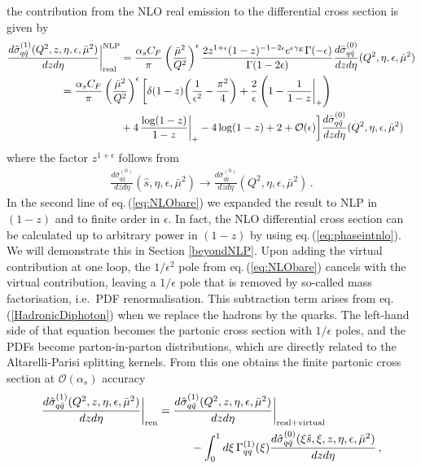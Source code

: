 \documentclass[11pt]{article}
\newcommand{\nn}{\nonumber}
\newcommand{\ord}{{\cal O}}
\newcommand{\eps}{\epsilon}
\newcommand\eqn[1]     {eq.\,(\ref{#1})}
\begin{document}
the contribution from the NLO real emission to 
the differential cross section is given by
\begin{align}\label{eq:NLObare}
    \frac{d\hat{\sigma}_{q\bar{q}}^{(1)}(Q^2,z,\eta,\epsilon,\bar\mu^2)}{dzd\eta}\bigg|_{\text{real}}^{\text{NLP}}&= \frac{\alpha_sC_F}{\pi}\left(\frac{\bar\mu^2}{Q^2}\right)^{\epsilon}\frac{2z^{1+\epsilon}(1-z)^{-1-2\epsilon}e^{\eps\gamma_E}\Gamma(-\epsilon)}{\Gamma(1-2\epsilon)}\frac{d\bar{\sigma}^{(0)}_{q\bar{q}}}{dzd\eta}(Q^2,\eta,\epsilon,\bar\mu^2)\nn\\
    &\hspace{-2.0cm}=\frac{\alpha_sC_F}{\pi}\left(\frac{\bar\mu^2}{Q^2}\right)^\eps\bigg[\delta(1-z)\bigg(\frac{1}{\eps^2}- \frac{\pi^2}{4}\bigg)+\frac{2}{\eps}\left(1-\frac{1}{1-z}\bigg|_+\right) \\  \nn
    &\hspace{0.0cm}+4 \,\frac{\log(1-z)}{1-z}\bigg|_+-4\log(1-z) + 2 +\ord(\eps) \bigg] \frac{d\bar{\sigma}^{(0)}_{q\bar{q}}}{dzd\eta}(Q^2,\eta,\epsilon,\bar\mu^2)
\end{align}
where the factor $z^{1+\epsilon}$ follows from
\begin{align}
    \frac{d\bar{\sigma}^{(0)}_{q\bar{q}}}{dzd\eta}(\hat{s},\eta,\epsilon,\bar\mu^2) \rightarrow \frac{d\bar{\sigma}^{(0)}_{q\bar{q}}}{dzd\eta}(Q^2,\eta,\epsilon,\bar\mu^2) \,.
\end{align}
In the second line of \eqn{eq:NLObare} we expanded 
the result to NLP in $(1-z)$ and to finite order in $\epsilon$. In fact, the NLO differential cross 
section can be calculated up to arbitrary power 
in $(1-z)$ by using \eqn{eq:phaseintnlo}. We will
demonstrate this in Section \ref{beyondNLP}.
%
Upon adding the virtual contribution at one loop, 
the $1/\eps^2$ pole from \eqn{eq:NLObare} cancels 
with the virtual contribution, leaving a $1/\eps$ 
pole that is removed by so-called mass factorisation, i.e.\ PDF renormalisation. This 
subtraction term arises from \eqn{HadronicDiphoton} 
when we replace the hadrons by the quarks. The 
left-hand side of that equation becomes the 
partonic cross section with $1/\eps$ poles, and 
the PDFs become parton-in-parton distributions, 
which are directly related to the Altarelli-Parisi 
splitting kernels. From this one obtains the finite partonic cross section at $\mathcal{O}(\alpha_s)$ accuracy
\begin{align}\label{eq:massfactorisation}
     \frac{d\hat{\sigma}_{q\bar{q}}^{(1)}(Q^2,z,\eta,\epsilon,\bar\mu^2)}{dzd\eta}\bigg|_{\text{ren}} & = \frac{d\hat{\sigma}_{q\bar{q}}^{(1)}(Q^2,z,\eta,\epsilon,\bar\mu^2)}{dzd\eta}\bigg|_{\text{real}+\text{virtual}} \nn \\
     &\hspace{1.0cm}
     -\int_0^1d\xi\,\Gamma_{qq}^{(1)}(\xi)\frac{d\hat{\sigma}_{q\bar{q}}^{(0)}(\xi\hat{s},\xi,z,\eta,\epsilon,\bar\mu^2)}{dzd\eta}\,,
\end{align}
\end{document}
